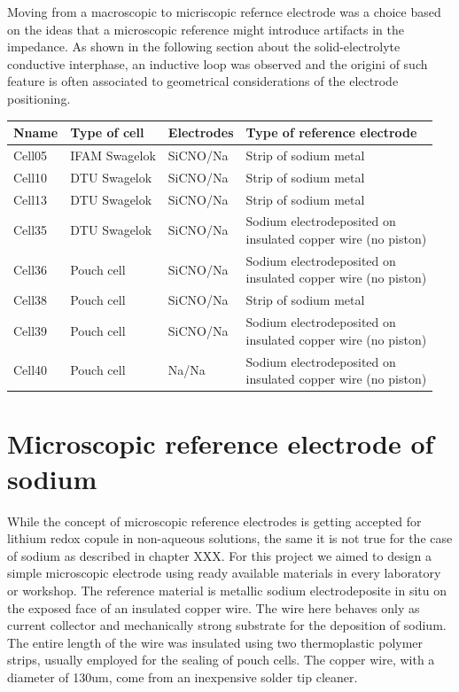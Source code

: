 Moving from a macroscopic to micriscopic refernce electrode was a choice based on the ideas that a microscopic reference might introduce artifacts in the impedance. As shown in the following section about the solid-electrolyte conductive interphase, an inductive loop was observed and the origini of such feature is often associated to geometrical considerations of the electrode positioning.

\begin{table}
\centering

\begin{tabular}{l l l l}
\toprule
\textbf{Nname} & \textbf{Type of cell} & \textbf{Electrodes} & \textbf{Type of reference electrode} \\
\toprule
Cell05 & IFAM Swagelok & SiCNO/Na & Strip of sodium metal \\
Cell10 & DTU Swagelok & SiCNO/Na & Strip of sodium metal \\
Cell13 & DTU Swagelok & SiCNO/Na & Strip of sodium metal \\
Cell35 & DTU Swagelok & SiCNO/Na & \thead[l]{Sodium electrodeposited on \\insulated copper wire (no piston) }\\
Cell36 & Pouch cell & SiCNO/Na & \thead[l]{Sodium electrodeposited on \\insulated copper wire (no piston) } \\
Cell38 & Pouch cell & SiCNO/Na & Strip of sodium metal \\
Cell39 & Pouch cell & SiCNO/Na & \thead[l]{Sodium electrodeposited on \\insulated copper wire (no piston) } \\
Cell40 & Pouch cell & Na/Na & \thead[l]{Sodium electrodeposited on \\insulated copper wire (no piston) } \\
\bottomrule

\end{tabular}

\end{table}


\section{Microscopic reference electrode of sodium}

 While the concept of microscopic reference electrodes is getting accepted for lithium redox copule   in non-aqueous solutions, the same it is not true for the case of sodium as described in chapter XXX. For this project we aimed to design a simple microscopic electrode using ready available materials in every laboratory or workshop. The reference material is metallic sodium electrodeposite in situ on the exposed face of an insulated copper wire. The wire here behaves only as current collector and mechanically strong substrate for the deposition of sodium. The entire length of the wire was insulated using two thermoplastic polymer strips, usually employed for the sealing of pouch cells. The copper wire, with a diameter of 130um, come from an inexpensive solder tip cleaner. 

